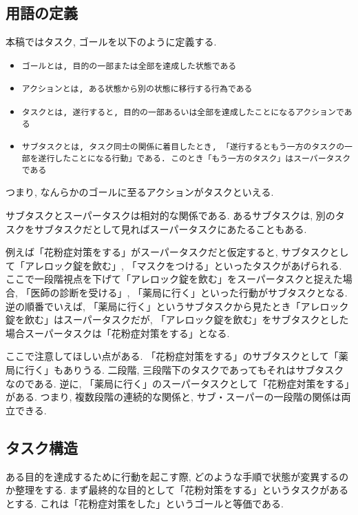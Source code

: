 \documentclass[submit,techreq]{ipsj}
\def\|{\verb|}
\begin{document}
%3.1
\subsection{用語の定義}

本稿ではタスク, ゴールを以下のように定義する.

\begin{itemize}
\item \|ゴールとは, 目的の一部または全部を達成した状態である|
\item \|アクションとは, ある状態から別の状態に移行する行為である|
\item \|タスクとは, 遂行すると, 目的の一部あるいは全部を達成したことになるアクションである|
\item \|サブタスクとは, タスク同士の関係に着目したとき, 「遂行するともう一方のタスクの一部を遂行したことになる行動」である. このとき「もう一方のタスク」はスーパータスクである|
\end{itemize}


つまり, なんらかのゴールに至るアクションがタスクといえる.

サブタスクとスーパータスクは相対的な関係である. あるサブタスクは, 別のタスクをサブタスクだとして見ればスーパータスクにあたることもある.

例えば「花粉症対策をする」がスーパータスクだと仮定すると, サブタスクとして「アレロック錠を飲む」, 「マスクをつける」といったタスクがあげられる. ここで一段階視点を下げて「アレロック錠を飲む」をスーパータスクと捉えた場合, 「医師の診断を受ける」, 「薬局に行く」といった行動がサブタスクとなる. 逆の順番でいえば, 「薬局に行く」というサブタスクから見たとき「アレロック錠を飲む」はスーパータスクだが, 「アレロック錠を飲む」をサブタスクとした場合スーパータスクは「花粉症対策をする」となる.

ここで注意してほしい点がある. 「花粉症対策をする」のサブタスクとして「薬局に行く」もありうる. 二段階, 三段階下のタスクであってもそれはサブタスクなのである. 逆に, 「薬局に行く」のスーパータスクとして「花粉症対策をする」がある. つまり, 複数段階の連続的な関係と, サブ・スーパーの一段階の関係は両立できる.


\subsection{タスク構造}
ある目的を達成するために行動を起こす際, どのような手順で状態が変異するのか整理をする. まず最終的な目的として「花粉対策をする」というタスクがあるとする. これは「花粉症対策をした」というゴールと等価である.
\end{document}

